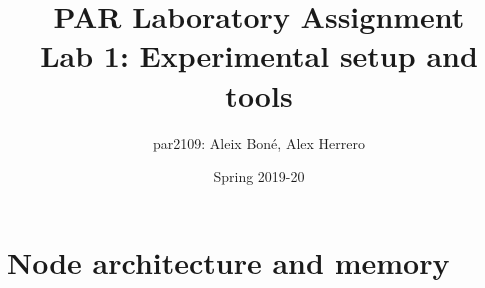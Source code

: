 

\renewcommand\theadfont{\bfseries}

\title{
    PAR Laboratory Assignment\\
    Lab 1: Experimental setup and tools
}

\author{
    par2109:
    Aleix Boné,
    Alex Herrero
}

\date{
    Spring 2019-20
}



%

\maketitle

\section{Node architecture and memory}%
\label{sec:node_architecture_and_memory}


